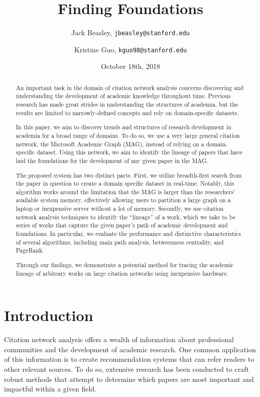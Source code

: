\documentclass[lettepaper,]{article}
\title{Finding Foundations}
\author{Jack Beasley, \texttt{jbeasley@stanford.edu} \and Kristine Guo, \texttt{kguo98@stanford.edu}}
\date{October 18th, 2018}
\begin{document}
\maketitle
\begin{abstract}
An important task in the domain of citation network analysis concerns
discovering and understanding the development of academic knowledge
throughout time. Previous research has made great strides in
understanding the structures of academia, but the results are limited to
narrowly-defined concepts and rely on domain-specific datasets.

In this paper, we aim to discover trends and structures of research
development in academia for a broad range of domains. To do so, we use a
very large general citation network, the Microsoft Academic Graph (MAG),
instead of relying on a domain-specific dataset. Using this network, we
aim to identify the lineage of papers that have laid the foundations for
the development of any given paper in the MAG.

The proposed system has two distinct parts. First, we utilize
breadth-first search from the paper in question to create a domain
specific dataset in real-time. Notably, this algorithm works around the
limitation that the MAG is larger than the researchers' available system
memory, effectively allowing users to partition a large graph on a
laptop or inexpensive server without a lot of memory. Secondly, we use
citation network analysis techniques to identify the ``lineage'' of a
work, which we take to be series of works that capture the given paper's
path of academic development and foundations. In particular, we evaluate
the performance and distinctive characteristics of several algorithms,
including main path analysis, betweenness centrality, and PageRank.

Through our findings, we demonstrate a potential method for tracing the
academic lineage of arbitrary works on large citation networks using
inexpensive hardware.
\end{abstract}

\hypertarget{introduction}{%
\section{Introduction}\label{introduction}}

Citation network analysis offers a wealth of information about
professional communities and the development of academic research. One
common application of this information is to create recommendation
systems that can refer readers to other relevant sources. To do so,
extensive research has been conducted to craft robust methods that
attempt to determine which papers are most important and impactful
within a given field.
\end{document}
